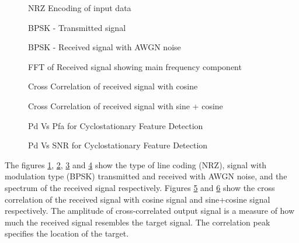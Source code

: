 \documentclass[a4paper]{article}
\begin{document}
\begin{figure}[h!bt]
  \centering
  
  \caption{NRZ Encoding of input data}
  \label{fig:3.1}
\end{figure}
\begin{figure}[h!bt]
  \centering
  
  \caption{BPSK - Transmitted signal}
  \label{fig:3.2}
\end{figure}
\begin{figure}[h!bt]
  \centering
  
  \caption{BPSK - Received signal with AWGN noise}
  \label{fig:3.3}
\end{figure}
\begin{figure}[h!bt]
  \centering
  
  \caption{FFT of Received signal showing main frequency component}
  \label{fig:3.4}
\end{figure}
\begin{figure}[h!bt]
  \centering
  
  \caption{Cross Correlation of received signal with cosine}
  \label{fig:3.5}
\end{figure}
\begin{figure}[h!bt]
  \centering
  
  \caption{Cross Correlation of received signal with sine + cosine}
  \label{fig:3.6}
\end{figure}
\begin{figure}[h!bt]
  \centering
  
  \caption{Pd Vs Pfa for Cyclostationary Feature Detection}
  \label{fig:3.7}
\end{figure}
\begin{figure}[h!bt]
  \centering
  
  \caption{Pd Vs SNR for Cyclostationary Feature Detection}
  \label{fig:3.8}
\end{figure}
The figures \ref{fig:3.1}, \ref{fig:3.2}, \ref{fig:3.3} and \ref{fig:3.4} show the type of line coding (NRZ), signal with modulation type (BPSK) transmitted and received with AWGN noise, and the spectrum of the received signal respectively. Figures \ref{fig:3.5} and \ref{fig:3.6} show the cross correlation of the received signal with cosine signal and sine+cosine signal respectively. The amplitude of cross-correlated output signal is a measure of how much the received signal resembles the target signal. The correlation peak specifies the location of the target.\\[8pt]
\end{document}
